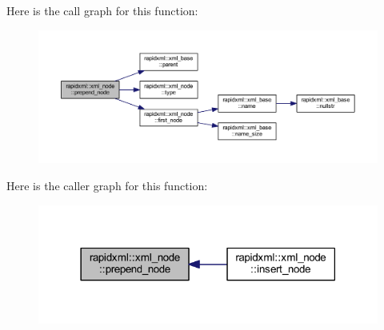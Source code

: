 Here is the call graph for this function\+:
\nopagebreak
\begin{figure}[H]
\begin{center}
\leavevmode
\includegraphics[width=350pt]{singletonrapidxml_1_1xml__node_ae86e92908c3eab40bbed8216e4f3f3cb_cgraph}
\end{center}
\end{figure}




Here is the caller graph for this function\+:
\nopagebreak
\begin{figure}[H]
\begin{center}
\leavevmode
\includegraphics[width=318pt]{singletonrapidxml_1_1xml__node_ae86e92908c3eab40bbed8216e4f3f3cb_icgraph}
\end{center}
\end{figure}


